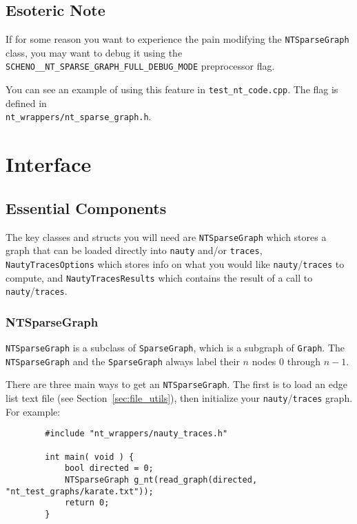 \documentclass{article}
\begin{document}
\subsection{Esoteric Note}

If for some reason you want to experience the pain modifying the \verb|NTSparseGraph| class, you may want to debug it using the \verb|SCHENO__NT_SPARSE_GRAPH_FULL_DEBUG_MODE| preprocessor flag.

You can see an example of using this feature in \verb|test_nt_code.cpp|. The flag is defined in\\\verb|nt_wrappers/nt_sparse_graph.h|.

\newpage

\section{Interface}\label{sec:interface}

\subsection{Essential Components}

The key classes and structs you will need are \verb|NTSparseGraph| which stores a graph that can be loaded directly into \verb|nauty| and/or \verb|traces|, \verb|NautyTracesOptions| which stores info on what you would like \verb|nauty|/\verb|traces| to compute, and \verb|NautyTracesResults| which contains the result of a call to \verb|nauty|/\verb|traces|.

\subsubsection{NTSparseGraph}

\verb|NTSparseGraph| is a subclass of \verb|SparseGraph|, which is a subgraph of \verb|Graph|. The \verb|NTSparseGraph| and the \verb|SparseGraph| always label their $n$ nodes 0 through $n - 1$.

There are three main ways to get an \verb|NTSparseGraph|. The first is to load an edge list text file (see Section~\ref{sec:file_utils}), then initialize your \verb|nauty|/\verb|traces| graph. For example:

\begin{verbatim}
        #include "nt_wrappers/nauty_traces.h"
        
        int main( void ) {
            bool directed = 0;
            NTSparseGraph g_nt(read_graph(directed, "nt_test_graphs/karate.txt"));
            return 0;
        }
\end{verbatim}
\end{document}
